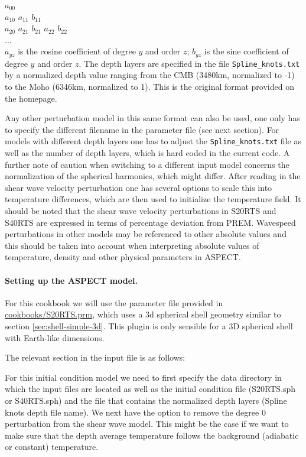 \documentclass{article}
\newcommand{\aspect}{\textsc{ASPECT}}
\begin{document}
\noindent $a_{00}$ \\
$a_{10}$ $a_{11}$ $b_{11}$ \\
$a_{20}$ $a_{21}$ $b_{21}$ $a_{22}$ $b_{22}$ \\
... \\

$a_{yz}$ is the cosine coefficient of degree $y$ and order $z$; $b_{yz}$ is 
the sine coefficient of degree $y$ and order $z$. The depth layers are specified 
in the file \texttt{Spline\_knots.txt} by a normalized depth value ranging from the CMB (3480km, 
normalized to -1) to the Moho (6346km, normalized to 1). This is the original
format provided on the homepage. 

Any other perturbation model in this same format can also be used, one only
has to specify the different filename in the parameter file (see next section).
For models with different depth layers one has to adjust the \texttt{Spline\_knots.txt} 
file as well as the number of depth layers, which is hard coded in the current 
code. A further note of caution when switching to a different input model 
concerns the normalization of the spherical harmonics, which might differ.  
After reading in the shear wave velocity perturbation one has several options
to scale this into temperature differences, which are then used to initialize 
the temperature field. It should be noted that the shear wave velocity perturbations in 
S20RTS and S40RTS are expressed in terms of percentage deviation from PREM. Wavespeed perturbations
in other models may be referenced to other absolute values and this should be taken into account
when interpreting absolute values of temperature, density and other physical parameters in ASPECT.

\paragraph{Setting up the \aspect{} model.}

For this cookbook we will use the parameter file provided in 
\url{cookbooks/S20RTS.prm}, which uses a 3d spherical shell 
geometry similar to section \ref{sec:shell-simple-3d}. This plugin is only sensible 
for a 3D spherical shell with Earth-like dimensions. 

The relevant section in the input file is as follows:



For this initial condition model we need to first specify the data directory in which 
the input files are located as well as the initial condition file (S20RTS.sph or 
S40RTS.sph) and the file that contains the normalized depth layers (Spline knots depth file name). 
We next have the option to remove the degree 0 perturbation from the shear 
wave model. This might be the case if we want to make sure that the depth 
average temperature follows the background (adiabatic or constant) temperature.  
\end{document}

